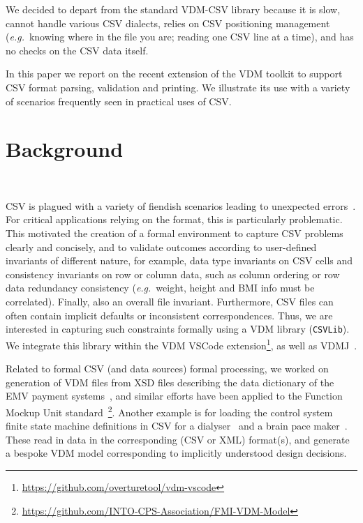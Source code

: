 \documentclass[runningheads,a4paper]{llncs}
\begin{document}
We decided to depart from the standard VDM-CSV library because it is slow, cannot handle various CSV dialects, relies on CSV positioning management (\textit{e.g.}~knowing where in the file you are; reading one CSV line at a time), and has no checks on the CSV data itself.        

In this paper we report on the recent extension of the VDM toolkit to support CSV format parsing, validation and printing. We illustrate its use with a variety of scenarios frequently seen in practical uses of CSV.       

\section{Background}~\label{sec:background}

CSV is plagued with a variety of fiendish scenarios leading to unexpected errors~\cite{csv-validation-pharma-msc,10.1145/3274856.3274879,alastairMSc}. For critical applications relying on the format, this is particularly problematic. This motivated the creation of a formal environment to capture CSV problems clearly and concisely, and to validate outcomes according to user-defined invariants of different nature, for example, data type invariants on CSV cells and consistency invariants on row or column data, such as column ordering or row data redundancy consistency (\textit{e.g.}~weight, height and BMI info must be correlated). Finally, also an overall file invariant. Furthermore, CSV files can often contain implicit defaults or inconsistent correspondences. Thus, we are interested in capturing such constraints formally using a VDM library (\texttt{CSVLib}). We integrate this library within the VDM VSCode extension\footnote{\url{https://github.com/overturetool/vdm-vscode}}, as well as VDMJ~\cite{Battle09}. 

Related to formal CSV (and data sources) formal processing, we worked on generation of VDM files from XSD files describing the data dictionary of the EMV payment systems~\cite{emv2}, and similar efforts have been applied to the Function Mockup Unit standard~\footnote{\url{https://github.com/INTO-CPS-Association/FMI-VDM-Model}}. Another example is for loading the control system finite state machine definitions in CSV for a dialyser~\cite{egleUG} and a brain pace maker~\cite{alastairMSc}. These read in data in the corresponding (CSV or XML) format(s), and generate a bespoke VDM model corresponding to implicitly understood design decisions. 
\end{document}
